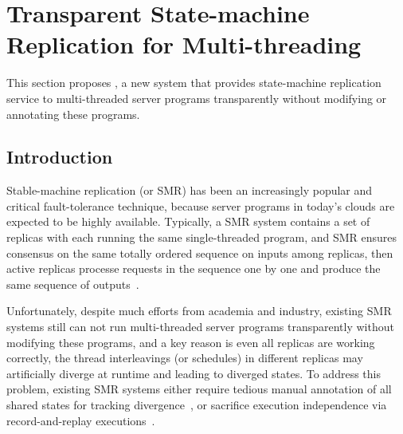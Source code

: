 \section{Transparent State-machine Replication for Multi-threading} 
\label{sec:rep}

This section proposes \msmr, a new system that provides 
state-machine replication service to multi-threaded server programs 
transparently without modifying or annotating these programs.
   
\subsection{Introduction} \label{sec:rep-intro}


Stable-machine replication (or SMR) has been an increasingly popular and critical fault-tolerance 
technique, because server programs in today's clouds are expected to be 
highly available. Typically, a SMR system contains a set of replicas with each 
running the same single-threaded program, and SMR ensures 
consensus on the same totally ordered sequence on inputs among replicas, then
active replicas processe requests in the sequence one by one and produce the same
sequence of outputs~\cite{paxos, pbft:osdi99, mencius:osdi08, saebft:sosp03}.

Unfortunately, despite much efforts from academia and industry, existing SMR systems 
still can not run multi-threaded server programs transparently without 
modifying these programs, and a key reason is even all replicas are working 
correctly, the thread interleavings (or schedules) in different replicas may 
artificially diverge at runtime and leading to diverged states. To address this 
problem, existing SMR systems either require tedious manual annotation of
all shared states for tracking divergence~\cite{eve:osdi12}, or sacrifice 
execution independence via record-and-replay executions~\cite{rex:eurosys14, 
vft:sosp95}.

